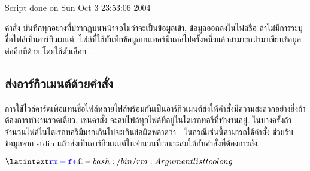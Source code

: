 \begin{thwbr}
\begin{MyExample}
\begin{MyEx}
Script done on Sun Oct  3 23:53:06 2004 
\end{MyEx}
\end{MyExample}
คำสั่ง  บันทึกทุกอย่างที่ปรากฏบนหน้าจอไม่ว่าจะเป็นข้อมูลเข้า, ข้อมูลออกลงในไฟล์ชื่อ  ถ้าไม่มีการระบุชื่อไฟล์เป็นอาร์กิวเมนต์. ไฟล์ที่ใช้บันทึกข้อมูลบนเทอร์มินอลไปครั้งหนึ่งแล้วสามารถนำมาเขียนข้อมูลต่ออีกทีด้วย  โดยใช้ตัวเลือก . 


% 


\subsection{ส่งอาร์กิวเมนต์ด้วยคำสั่ง }
การใช้ไวล์คาร์ดเพื่อแทนชื่อไฟล์หลายไฟล์พร้อมกันเป็นอาร์กิวเมนต์ส่งให้คำสั่งมีความสะดวกอย่างยิ่งถ้าต้องการทำงานรวดเดียว. เช่นคำสั่ง  จะลบไฟล์ทุกไฟล์ที่อยู่ในไดเรกทอรีที่ทำงานอยู่. ในบางครั้งถ้าจำนวนไฟล์ในไดเรกทอรีมีมากเกินไปจะเกินข้อผิดพลาดว่า . ในกรณีเช่นนี้สามารถใช้คำสั่ง  ช่วยรับข้อมูลจาก stdin แล้วส่งเป็นอาร์กิวเมนต์ในจำนวนที่เหมาะสมให้กับคำสั่งที่ต้องการสั่ง.

\begin{MyExample}
\begin{MyEx}
$ \cin{rm -f *}
-bash: /bin/rm: Argument list too long
$ 
\end{MyEx}
\end{MyExample}


\end{thwbr}
